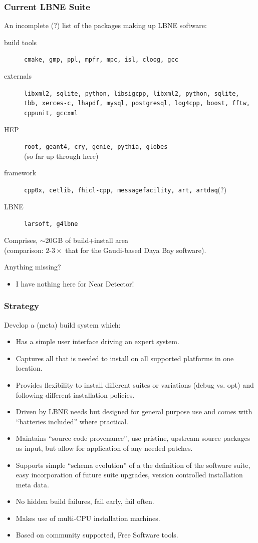 \documentclass[xcolor=dvipsnames]{beamer}
\begin{document}
\begin{frame}
  \frametitle{Current LBNE Suite}
  An incomplete (?) list of the packages making up LBNE software:
  \begin{description}
  \item[build tools] \texttt{cmake, gmp, ppl, mpfr, mpc, isl, cloog, gcc}
  \item[externals] \texttt{libxml2, sqlite, python, libsigcpp, libxml2, python, sqlite, tbb, xerces-c, lhapdf, mysql, postgresql, log4cpp, boost, fftw, cppunit, gccxml}
  \item[HEP] \texttt{root, geant4, cry, genie, pythia, globes} \\
    {\tiny (so far up through here)}
  \item[framework] \texttt{cpp0x, cetlib, fhicl-cpp, messagefacility, art, artdaq}(?)
  \item[LBNE] \texttt{larsoft, g4lbne}
  \end{description}
  Comprises, $\sim$20GB of build+install area \\
  (comparison: $2\mbox{-}3\times$ that for the Gaudi-based Daya Bay software).

  \vspace{5mm}
  
  Anything missing?
  \begin{itemize}
  \item I have nothing here for Near Detector!
  \end{itemize}
  
\end{frame}

\begin{frame}
  \frametitle{Strategy}
  Develop a (meta) build system which:
  \footnotesize
  \begin{itemize}
  \item Has a simple user interface driving an expert system.
  \item Captures all that is needed to install on all supported platforms in one location.
  \item Provides flexibility to install different suites or variations (debug vs. opt) and following different installation policies.
  \item Driven by LBNE needs but designed for general purpose use and comes with ``batteries included'' where practical.
  \item Maintains ``source code provenance'', use pristine, upstream source packages as input, but allow for application of any needed patches.
  \item Supports simple ``schema evolution'' of a the definition of the software suite,  easy incorporation of future suite upgrades, version controlled installation meta data.
  \item No hidden build failures, fail early, fail often.
  \item Makes use of multi-CPU installation machines.
  \item Based on community supported, Free Software tools.
  \end{itemize}
\end{frame}
\end{document}
